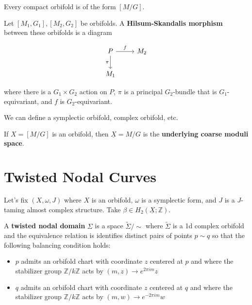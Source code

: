 \begin{theorem}
[Pardon]

Every compact orbifold is of the form $[M/G]$.

\end{theorem}

\begin{definition}

Let $[M_1, G_1], [M_2, G_2]$ be orbifolds. A \textbf{Hilsum-Skandalis morphism} between these orbifolds is a diagram

\[\begin{tikzcd}
	P & {M_2} \\
	{M_1}
	\arrow["f", from=1-1, to=1-2]
	\arrow["\pi"', from=1-1, to=2-1]
\end{tikzcd}\]

where there is a $G_1\times G_2$ action on $P$, $\pi$ is a principal $G_2$-bundle that is $G_1$-equivariant, and $f$ is $G_2$-equivariant.

\end{definition}

We can define a symplectic orbifold, complex orbifold, etc.

\begin{definition}

If $X=[M/G]$ is an orbifold, then $\underline{X}=M/G$ is the \textbf{underlying coarse moduli space}.

\end{definition}


\section{Twisted Nodal Curves}

Let's fix $(X,\omega, J)$ where $X$ is an orbifold, $\omega$ is a symplectic form, and $J$ is a $J$-taming almost complex structure. Take $\beta \in H_2(\underline{X}; \mathbb{Z})$.

\begin{definition}

A \textbf{twisted nodal domain} $\Sigma$ is a space $\tilde{\Sigma}/\sim$ where $\tilde{\Sigma}$ is a 1d complex orbifold and the equivalence relation is identifies distinct pairs of points $p\sim q$ so that the following balancing condition holds:
\begin{itemize}
\item $p$ admits an orbifold chart with coordinate $z$ centered at $p$ and where the stabilizer group $\mathbb{Z}/k\mathbb{Z}$ acts by $(m,z)\to e^{2\pi i m} z$
\item $q$ admits an orbifold chart with coordinate $z$ centered at $q$ and where the stabilizer group $\mathbb{Z}/k\mathbb{Z}$ acts by $(m,w)\to e^{-2\pi i m} w$
\end{itemize}

\end{definition}

